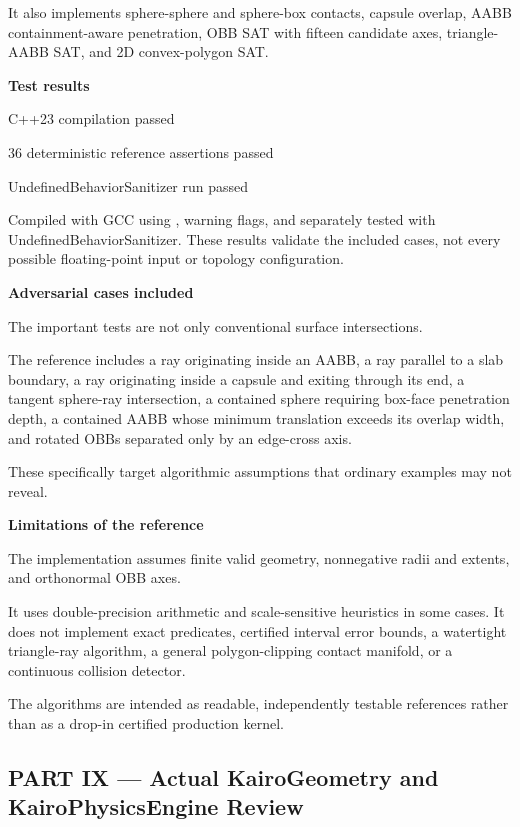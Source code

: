 It also implements sphere-sphere and sphere-box contacts, capsule overlap, AABB containment-aware penetration, OBB SAT with fifteen candidate axes, triangle-AABB SAT, and 2D convex-polygon SAT.

\textbf{Test results}

C++23 compilation passed

36 deterministic reference assertions passed

UndefinedBehaviorSanitizer run passed

Compiled with GCC using , warning flags, and separately tested with UndefinedBehaviorSanitizer. These results validate the included cases, not every possible floating-point input or topology configuration.

\textbf{Adversarial cases included}

The important tests are not only conventional surface intersections.

The reference includes a ray originating inside an AABB, a ray parallel to a slab boundary, a ray originating inside a capsule and exiting through its end, a tangent sphere-ray intersection, a contained sphere requiring box-face penetration depth, a contained AABB whose minimum translation exceeds its overlap width, and rotated OBBs separated only by an edge-cross axis.

These specifically target algorithmic assumptions that ordinary examples may not reveal.

\textbf{Limitations of the reference}

The implementation assumes finite valid geometry, nonnegative radii and extents, and orthonormal OBB axes.

It uses double-precision arithmetic and scale-sensitive heuristics in some cases. It does not implement exact predicates, certified interval error bounds, a watertight triangle-ray algorithm, a general polygon-clipping contact manifold, or a continuous collision detector.

The algorithms are intended as readable, independently testable references rather than as a drop-in certified production kernel.

\subsection{PART IX --- Actual KairoGeometry and KairoPhysicsEngine Review}\label{04-visual-computing-ii-ch025-part-ix-actual-kairogeometry-and-kairophysicsengine-review}

